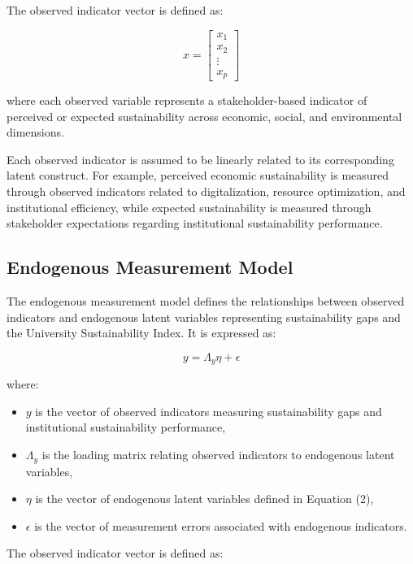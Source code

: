 \documentclass[11pt,a4paper]{article}
\begin{document}
The observed indicator vector is defined as:

\begin{equation}
x =
\begin{bmatrix}
x_1 \\
x_2 \\
\vdots \\
x_p
\end{bmatrix}
\end{equation}

where each observed variable represents a stakeholder-based indicator of perceived or expected sustainability across economic, social, and environmental dimensions.

Each observed indicator is assumed to be linearly related to its corresponding latent construct. For example, perceived economic sustainability is measured through observed indicators related to digitalization, resource optimization, and institutional efficiency, while expected sustainability is measured through stakeholder expectations regarding institutional sustainability performance.

\subsection{Endogenous Measurement Model}

The endogenous measurement model defines the relationships between observed indicators and endogenous latent variables representing sustainability gaps and the University Sustainability Index. It is expressed as:

\begin{equation}
y = \Lambda_y \eta + \epsilon
\end{equation}

where:

\begin{itemize}
\item $y$ is the vector of observed indicators measuring sustainability gaps and institutional sustainability performance,
\item $\Lambda_y$ is the loading matrix relating observed indicators to endogenous latent variables,
\item $\eta$ is the vector of endogenous latent variables defined in Equation (2),
\item $\epsilon$ is the vector of measurement errors associated with endogenous indicators.
\end{itemize}

The observed indicator vector is defined as:
\end{document}
